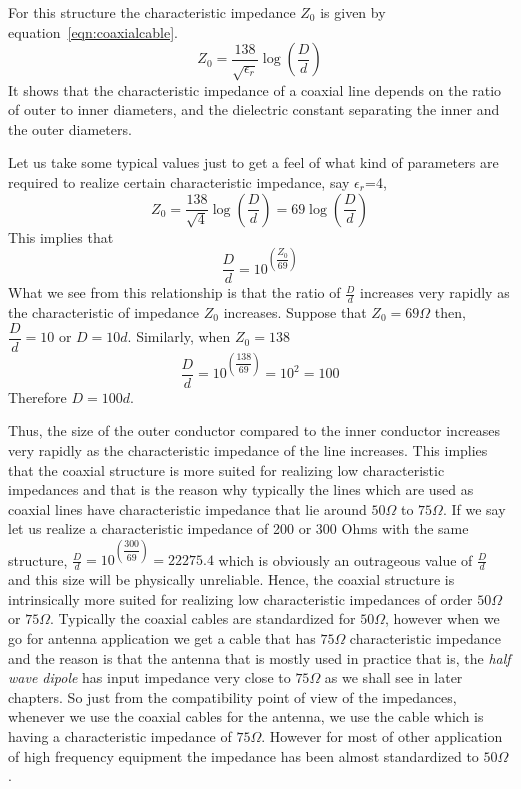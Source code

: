 For this structure the characteristic impedance $Z_0$ is given by equation~\eqref{eqn:coaxialcable}.
\begin{equation}
Z_0 =\frac{138}{\sqrt{\epsilon_r}}\log(\dfrac{D}{d})
\label{eqn:coaxialcable}
\end{equation}
It shows that the characteristic impedance of a coaxial line depends on the ratio of outer to inner diameters, and the dielectric constant separating the inner and the outer diameters.

Let us take some typical values just to get a feel of what kind of parameters are required to realize certain characteristic impedance, say $\epsilon_r$=4, 
\begin{dmath*}
Z_0 =\dfrac{138}{\sqrt{4}}\log(\dfrac{D}{d})
= 69\log(\dfrac{D}{d})
\end{dmath*}
This implies that
\begin{dmath*}
\frac{D}{d}=10^{\left(\dfrac{Z_0 }{69}\right)}
\end{dmath*}
What we see from this relationship is that the ratio of $\frac{D}{d}$ increases very rapidly as the characteristic of impedance $Z_0 $ increases. Suppose that $Z_0 = 69\varOmega$ then, $\dfrac{D}{d}= 10$ or $D=10d$. Similarly, when $Z_0 = 138$
\begin{dmath*}
\dfrac{D}{d}=10^{\left(\dfrac{138}{69}\right)}=10^{2}=100
\end{dmath*}
Therefore $D=100d$.

Thus, the size of the outer conductor compared to the inner conductor increases very rapidly as the characteristic impedance of the line increases. This implies that the coaxial structure is more suited for realizing low characteristic impedances and that is the reason why typically the lines which are used as coaxial lines have characteristic impedance that lie around $50\varOmega$ to $75\varOmega$. If we say let us realize a characteristic impedance of 200 or 300 Ohms with the same structure, $\frac{D}{d} = 10^{\left(\dfrac{300}{69}\right)} = 22275.4$ which is obviously an outrageous value of $\frac{D}{d}$ and this size will be physically unreliable. Hence, the coaxial structure is intrinsically more suited for realizing low characteristic impedances of order $50\varOmega$ or $75\varOmega$. Typically the coaxial cables are standardized for $50\varOmega$, however when we go for antenna application we get a cable that has $75\varOmega$ characteristic impedance and the reason is that the antenna that is mostly used in practice that is, the \emph{half wave dipole} has input impedance very close to $75\varOmega$ as we shall see in later chapters. So just from the compatibility point of view of the impedances, whenever we use the coaxial cables for the antenna, we use the cable which is having a characteristic impedance of $75\varOmega$. However for most of other application of high frequency equipment the impedance has been almost standardized to $50\varOmega$.

